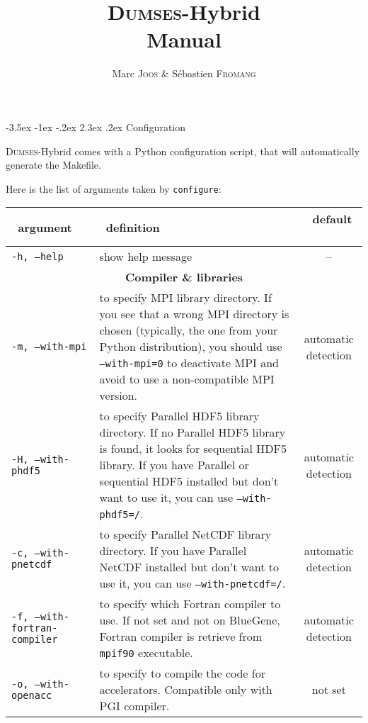 \documentclass[a4paper,12pt]{article}
\author{Marc \textsc{Joos} \& S\'ebastien \textsc{Fromang}}
\title{\textsc{Dumses}-Hybrid \\ Manual}
\date{ }
\makeatletter
\renewcommand{\section}{\@startsection {section}{1}{\z@}%
             {-3.5ex \@plus -1ex \@minus -.2ex}%
             {2.3ex \@plus .2ex}%
             {\normalfont\Large\sffamily\bfseries}}
\makeatother
\begin{document}
    
\vspace*{-9em}
        {\let\newpage\relax\maketitle}

\section{Configuration}

\textsc{Dumses}-Hybrid comes with a Python configuration script, that will automatically generate the Makefile.

Here is the list of arguments taken by \texttt{configure}:
\begin{table}[h!]
  \centering
  {\footnotesize
    \begin{tabular}{l | p{} | c }
      ~\hfill argument\hfill~ & ~\hfill definition\hfill~ & ~\hfill default \hfill~ \\
      \hline
      \hline
      \texttt{-h, --help} & show help message & -- \\
      \hline
      \multicolumn{3}{c}{\normalsize \bfseries Compiler \& libraries} \\
      \hline
      \texttt{-m, --with-mpi} & to specify MPI library directory. If you see that a wrong MPI directory is chosen (typically, the one from your Python distribution), you should use \texttt{--with-mpi=0} to deactivate MPI and avoid to use a non-compatible MPI version. & automatic detection \\
      \texttt{-H, --with-phdf5} & to specify Parallel HDF5 library directory. If no Parallel HDF5 library is found, it looks for sequential HDF5 library. If you have Parallel or sequential HDF5 installed but don't want to use it, you can use \texttt{--with-phdf5=/}. & automatic detection \\
      \texttt{-c, --with-pnetcdf} & to specify Parallel NetCDF library directory. If you have Parallel NetCDF installed but don't want to use it, you can use \texttt{--with-pnetcdf=/}. & automatic detection \\
      \texttt{-f, --with-fortran-compiler} & to specify which Fortran compiler to use. If not set and not on BlueGene, Fortran compiler is retrieve from \texttt{mpif90} executable. & automatic detection \\
      \texttt{-o, --with-openacc} & to specify to compile the code for accelerators. Compatible only with PGI compiler. & not set \\

\end{tabular}}
\end{table}
\end{document}

